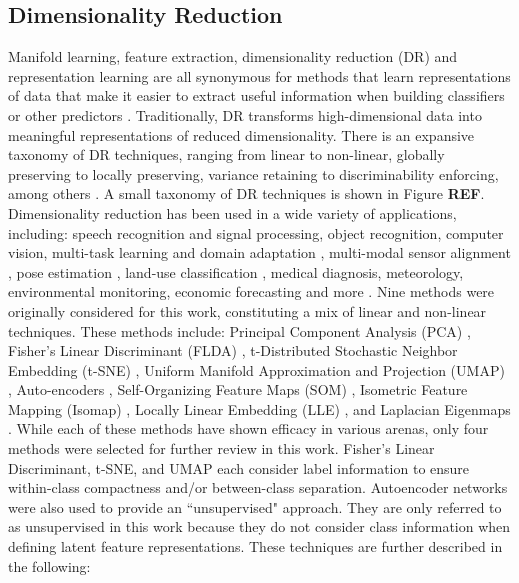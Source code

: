 \documentclass[conference]{IEEEtran}
\begin{document}
	\subsection{Dimensionality Reduction}
	Manifold learning, feature extraction, dimensionality reduction (DR) and representation learning are all synonymous for methods that learn representations of data that make it easier to extract useful information when building classifiers or other predictors \cite{Bengio2014RepLearningReview}. Traditionally, DR transforms high-dimensional data into meaningful representations of reduced dimensionality.  There is an expansive taxonomy of DR techniques, ranging from linear to non-linear, globally preserving to locally preserving, variance retaining to discriminability enforcing, among others \cite{VanDerMaaten2009DRReview}.  A small taxonomy of DR techniques is shown in Figure \textbf{REF}.   Dimensionality reduction has been used in a wide variety  of applications, including: speech recognition and signal processing, object recognition, computer vision, multi-task learning and domain adaptation \cite{Bengio2014RepLearningReview}, multi-modal sensor alignment \cite{zhang2010multisourceremotingsensingfusion,Davenport2010JointManifoldsDataFusion}, pose estimation \cite{Navaratnam2007JointManifoldSemiSupRegression}, land-use classification \cite{Hong2019LearnableManifoldAlignment}, medical diagnosis, meteorology, environmental monitoring, economic forecasting and more \cite{Zitova2003SurveyImageRegistrationMethods}.  Nine methods were originally considered for this work, constituting a mix of linear and non-linear techniques.  These methods include: Principal Component Analysis (PCA) \cite{Tipping1999PPCA,Murphy2012Textbook}, Fisher's Linear Discriminant (FLDA) \cite{Murphy2012Textbook,Sugiyama2006FDASupDimRed}, t-Distributed Stochastic Neighbor Embedding (t-SNE) \cite{vanDerMaaten2008tSNE}, Uniform Manifold Approximation and Projection (UMAP) \cite{McInnes2018UMAP}, Auto-encoders \cite{Haykin2009NeuralNetworks,Goodfellow2016DeepLearning}, Self-Organizing Feature Maps (SOM) \cite{Haykin2009NeuralNetworks,Kohonen1990SOM,Fritzke1995GrowingNeuralGas}, Isometric Feature  Mapping (Isomap) \cite{Tenenbaum2000Isomap,Thorstensen2009ManifoldThesis,VanDerMaaten2009DRReview}, Locally Linear Embedding (LLE) \cite{Roweis2000LLE,Saul2001LLEIntro}, and Laplacian Eigenmaps \cite{Belkin2003LaplacianEigenmaps,VanDerMaaten2009DRReview}.  While each of these methods have shown efficacy in various arenas, only four methods were selected for further review in this work. Fisher's Linear Discriminant, t-SNE, and UMAP each consider label information to ensure within-class compactness and/or between-class separation.  Autoencoder networks were also used to provide an ``unsupervised" approach.  They are only referred to as unsupervised in this work because they do not consider class information when defining latent feature representations. These techniques are further described in the following:
	
\end{document}
